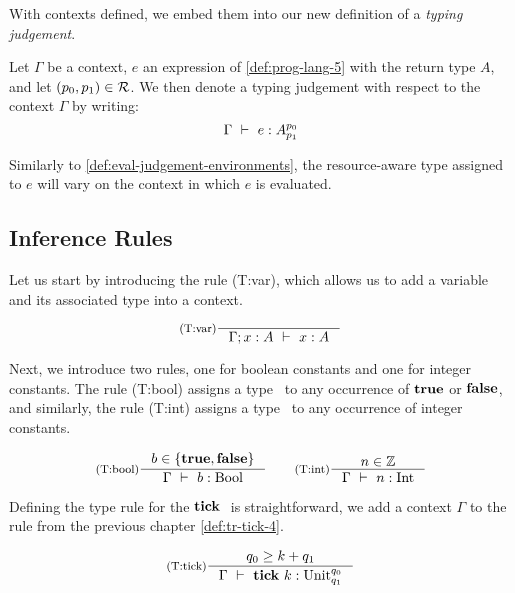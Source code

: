 With contexts defined, we embed them into our new definition of a \emph{typing judgement}.

\begin{definition}\label{def:type-judgement-context}
   Let \(\Gamma\) be a context, \(e\) an expression of \cref{def:prog-lang-5} with the return type \(A\), and let \((p_0, p_1) \in \mathcal{R}\). We then denote a typing judgement with respect to the context \(\Gamma\) by writing:
   \[
      \Gamma~\vdash~e:A ^{p_0}_{p_1}
   \]
\end{definition}

\begin{remark}
   Similarly to \cref{def:eval-judgement-environments}, the resource-aware type assigned to \(e\) will vary on the context in which \(e\) is evaluated. 
\end{remark}

\subsection{Inference Rules}\label{sec:inference-rules-letvar}

Let us start by introducing the rule (T:var), which allows us to add a variable and its associated type into a context.

\[
   \inference[(T:var)]
   {}
   {\typing{\Gamma; x: A}{x}{A}}
\]

Next, we introduce two rules, one for boolean constants and one for integer constants. The rule (T:bool) assigns a type \bool~to any occurrence of \(\mathbf{true}\) or \(\mathbf{false}\), and similarly, the rule (T:int) assigns a type \typeint~to any occurrence of integer constants.

\[
   \inference[(T:bool)]
   {b \in \{\true, \false\}}
   {\typing{\Gamma}{b}{\text{\bool}}}%
   \qquad
   \inference[(T:int)]
   {n \in \mathbb{Z}}
   {\typing{\Gamma}{n}{\text{\typeint}}}
\]

Defining the type rule for the \(\mathbf{tick}~\) is straightforward, we add a context \(\Gamma\) to the rule from the previous chapter \cref{def:tr-tick-4}. 

\[
   \inference[(T:tick)]
   {q_0 \geq k + q_1}
   {\typing{\Gamma}{\tick{k}}{\ratype{\unit}{q_0}{q_1}}}
\]

